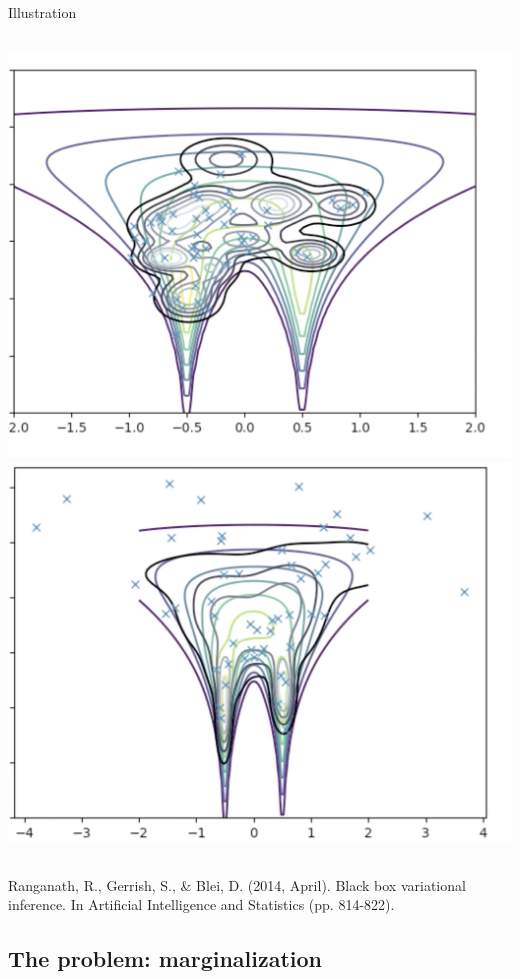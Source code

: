 \documentclass[10pt]{beamer}
\begin{document}
\begin{frame}{Illustration}
\begin{minipage}[t][.9\textheight]{\textwidth}
\begin{columns}[t]
\includegraphics[width=.7\textwidth]{images/intro_animation_3.png}\\
\includegraphics[width=.7\textwidth]{images/intro_animation_4.png}
\end{columns}

\vfill

\tiny Ranganath, R., Gerrish, S., \& Blei, D. (2014, April). Black box variational inference. In Artificial Intelligence and Statistics (pp. 814-822).
  \end{minipage}
  
\end{frame}


\subsection{The problem: marginalization}
\end{document}
